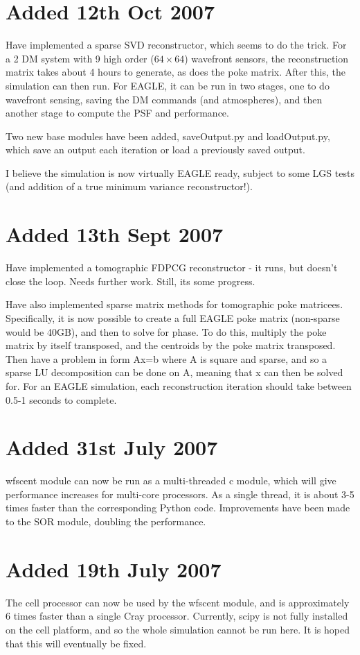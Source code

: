 \documentclass{article}
\begin{document}
\section{Added 12th Oct 2007}
Have implemented a sparse SVD reconstructor, which seems to do the
trick.  For a 2 DM system with 9 high order ($64\times64$) wavefront
sensors, the reconstruction matrix takes about 4 hours to generate, as
does the poke matrix.  After this, the simulation can then run.  For
EAGLE, it can be run in two stages, one to do wavefront sensing,
saving the DM commands (and atmospheres), and then another stage to
compute the PSF and performance.  

Two new base modules have been added, saveOutput.py and loadOutput.py,
which save an output each iteration or load a previously saved
output.

I believe the simulation is now virtually EAGLE ready, subject to some
LGS tests (and addition of a true minimum variance reconstructor!).

\section{Added 13th Sept 2007}
Have implemented a tomographic FDPCG reconstructor - it runs, but
doesn't close the loop.  Needs further work.  Still, its some
progress.

Have also implemented sparse matrix methods for tomographic poke
matricees.  Specifically, it is now possible to create a full EAGLE
poke matrix (non-sparse would be 40GB), and then to solve for phase.
To do this, multiply the poke matrix by itself transposed, and the
centroids by the poke matrix transposed.  Then have a problem in form
Ax=b where A is square and sparse, and so a sparse LU decomposition
can be done on A, meaning that x can then be solved for.  For an EAGLE
simulation, each reconstruction iteration should take between 0.5-1
seconds to complete.

\section{Added 31st July 2007}
wfscent module can now be run as a multi-threaded c module, which will
give performance increases for multi-core processors.  As a single
thread, it is about 3-5 times faster than the corresponding Python
code.  Improvements have been made to the SOR module, doubling the
performance.

\section{Added 19th July 2007}
The cell processor can now be used by the wfscent module, and is
approximately 6 times faster than a single Cray processor.  Currently,
scipy is not fully installed on the cell platform, and so the whole
simulation cannot be run here.  It is hoped that this will eventually
be fixed.
\end{document}
